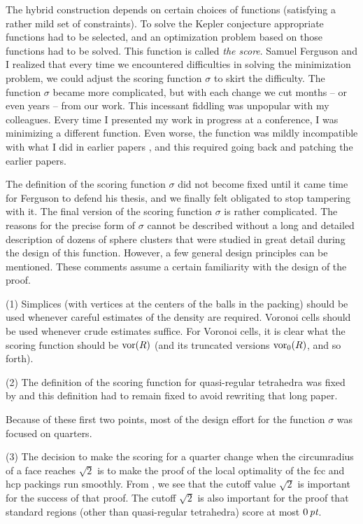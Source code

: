 The hybrid construction depends on certain choices of functions
(satisfying a rather mild set of constraints).  To solve the Kepler
conjecture appropriate functions had to be selected, and an
optimization problem based on those functions had to be solved. This
function is called {\it the score}.  Samuel Ferguson and I realized
that every time we encountered difficulties in solving the
minimization problem, we could adjust the scoring function $\sigma$
to skirt the difficulty.  The function $\sigma$ became more
complicated, but with each change we cut months -- or even years --
from our work.  This incessant fiddling was unpopular with my
colleagues.  Every time I presented my work in progress at a
conference, I was minimizing a different function.  Even worse, the
function was mildly incompatible with what I did in earlier papers
\cite{Hal97A} \cite{Hal97B}, and this required going back and
patching the earlier papers.

The definition of the scoring function $\sigma$ did not become
fixed until it came time for Ferguson to defend his thesis, and we
finally felt obligated to stop tampering with it.  The final
version of the scoring function $\sigma$ is rather complicated.
The reasons for the precise form of $\sigma$ cannot be described
without a long and detailed description of dozens of sphere
clusters that were studied in great detail during the design of
this function. However, a few general design principles can be
mentioned.  These comments assume a certain familiarity with the
design of the proof.


(1) Simplices (with vertices at the centers of the balls in the
packing) should be used whenever careful estimates of the density
are required.  Voronoi cells should be used whenever crude
estimates suffice.  For Voronoi cells, it is clear what the
scoring function should be $\operatorname{vor}(R)$ (and its truncated versions
$\operatorname{vor}_0(R)$, and so forth).


(2) The definition of the scoring function for quasi-regular
tetrahedra was fixed by \cite{Hal97A} and this definition had to
remain fixed to avoid rewriting that long paper.

Because of these first two points, most of the design effort for
the function $\sigma$ was focused on quarters.

(3)  The decision to make the scoring for a quarter change when
the circumradius of a face reaches $\sqrt2$ is to make the proof
of the local optimality of the fcc and hcp packings run smoothly.
From \cite{Hal97B}, we see that the cutoff value $\sqrt2$ is
important for the success of that proof.  The cutoff $\sqrt2$ is
also important for the proof that standard regions (other than
quasi-regular tetrahedra) score at most $0\,\hbox{\it pt}$.

